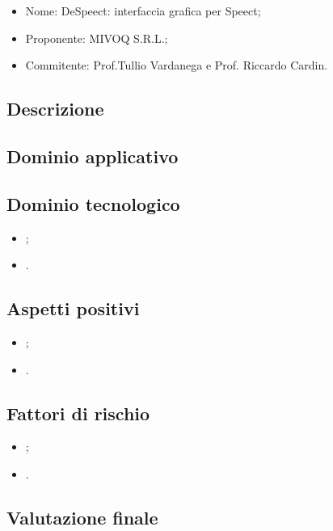 \documentclass[openany,12pt,a4paper]{report}
\begin{document}
\begin{itemize}
    \item{Nome:} DeSpeect: interfaccia grafica per Speect;
    \item{Proponente:} MIVOQ S.R.L.;
    \item{Commitente:} Prof.Tullio Vardanega e Prof. Riccardo Cardin.
\end{itemize}

\subsection{Descrizione}

\subsection{Dominio applicativo}

\subsection{Dominio tecnologico}

\begin{itemize}
    \item{};
    
    \item{}.
\end{itemize}

\subsection{Aspetti positivi}

\begin{itemize}
    \item ;
    
    \item  .
\end{itemize}
\subsection{Fattori di rischio}

\begin{itemize}
    \item ;
    
    \item .
\end{itemize}

\subsection{Valutazione finale}
\end{document}
